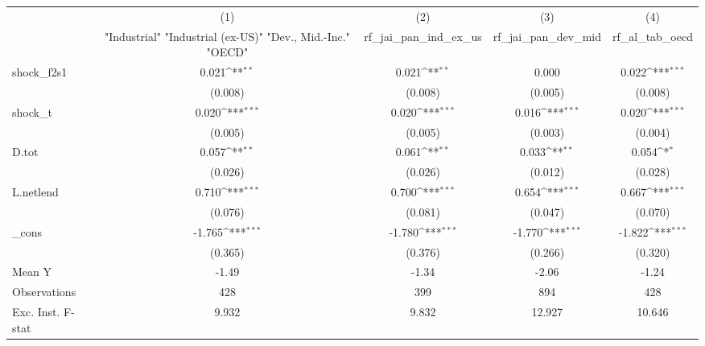 {
\def\sym#1{\ifmmode^{#1}\else\(^{#1}\)\fi}
\begin{tabular}{l*{4}{c}}
\toprule
            &\multicolumn{1}{c}{(1)}&\multicolumn{1}{c}{(2)}&\multicolumn{1}{c}{(3)}&\multicolumn{1}{c}{(4)}\\
            &\multicolumn{1}{c}{ "Industrial" "Industrial (ex-US)" "Dev., Mid.-Inc." "OECD" }&\multicolumn{1}{c}{rf\_jai\_pan\_ind\_ex\_us}&\multicolumn{1}{c}{rf\_jai\_pan\_dev\_mid}&\multicolumn{1}{c}{rf\_al\_tab\_oecd}\\
\midrule
shock\_f2s1  &       0.021\sym{**} &       0.021\sym{**} &       0.000         &       0.022\sym{***}\\
            &     (0.008)         &     (0.008)         &     (0.005)         &     (0.008)         \\
\addlinespace
shock\_t     &       0.020\sym{***}&       0.020\sym{***}&       0.016\sym{***}&       0.020\sym{***}\\
            &     (0.005)         &     (0.005)         &     (0.003)         &     (0.004)         \\
\addlinespace
D.tot       &       0.057\sym{**} &       0.061\sym{**} &       0.033\sym{**} &       0.054\sym{*}  \\
            &     (0.026)         &     (0.026)         &     (0.012)         &     (0.028)         \\
\addlinespace
L.netlend   &       0.710\sym{***}&       0.700\sym{***}&       0.654\sym{***}&       0.667\sym{***}\\
            &     (0.076)         &     (0.081)         &     (0.047)         &     (0.070)         \\
\addlinespace
\_cons      &      -1.765\sym{***}&      -1.780\sym{***}&      -1.770\sym{***}&      -1.822\sym{***}\\
            &     (0.365)         &     (0.376)         &     (0.266)         &     (0.320)         \\
\midrule
Mean Y      &       -1.49         &       -1.34         &       -2.06         &       -1.24         \\
Observations&         428         &         399         &         894         &         428         \\
Exc. Inst. F-stat&       9.932         &       9.832         &      12.927         &      10.646         \\
\bottomrule
\end{tabular}
}
